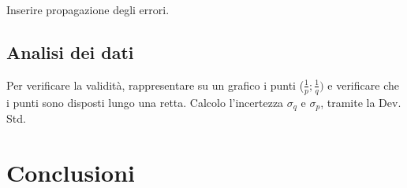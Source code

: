 Inserire propagazione degli errori. 
\subsection{Analisi dei dati}
Per verificare la validità, rappresentare su un grafico i punti ($\frac{1}{p};\frac{1}{q})$ e verificare che i punti sono disposti lungo una retta. 
Calcolo l'incertezza $\sigma_{q}$ e $\sigma_{p}$, tramite la Dev. Std. 



\section{Conclusioni}


